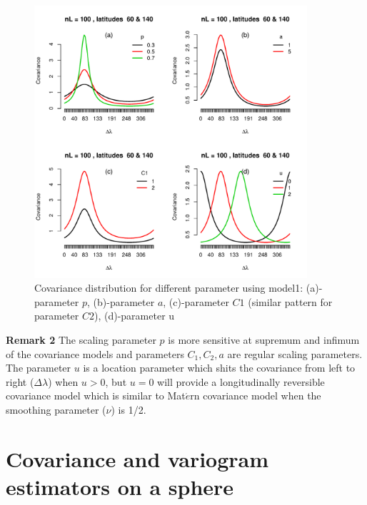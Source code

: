 	\begin{figure}[H]
		\centering
		\includegraphics[width=0.9\textwidth]{graphs/parameters_model1_2}
		\caption[Covariance distribution for different parameters using model1:] {Covariance distribution for different parameter using model1:  (a)-parameter $p$, (b)-parameter $a$, (c)-parameter $C1$ (similar pattern for parameter $C2$), (d)-parameter u}
	\end{figure}

{\bf Remark 2} The scaling parameter $p$ is more sensitive at supremum and infimum of the covariance models and parameters $C_1, C_2, a$ are regular scaling parameters. The parameter $u$ is a location parameter which shits the covariance from left to right ($\Delta\lambda$) when $u>0$, but $u=0$ will provide a longitudinally reversible covariance model which is similar to Mat$\acute{e}$rn covariance model when the smoothing parameter ($\nu$) is 1/2.  \\     


	\section{Covariance and variogram estimators on a sphere}
	
